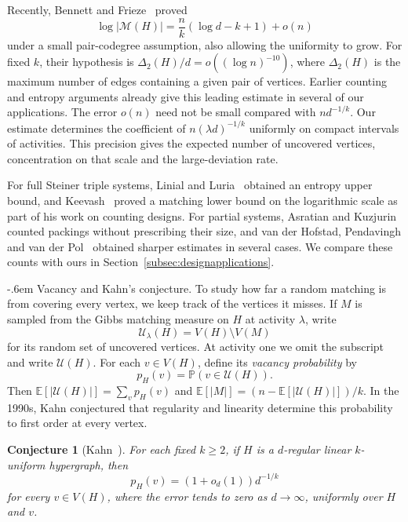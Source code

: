 \documentclass[11pt,reqno]{amsart}
\makeatletter
\numberwithin{equation}{section}
\renewcommand{\paragraph}{\@startsection{paragraph}{4}%
    \z@{.75\linespacing\@plus.2\linespacing\@minus.1\linespacing}%
    {-.6em}%
    {\normalfont\bfseries}}
\theoremstyle{plain}
\newtheorem{conjecture}[theorem]{Conjecture}
\theoremstyle{definition}
\newcommand{\calM}{\mathcal{M}}
\newcommand{\E}{\mathbb E}
\newcommand{\Prob}{\mathbb P}
\newcommand{\calU}{\mathcal U}
\makeatother
\begin{document}
Recently, Bennett and Frieze~\cite[Theorem~4(b)]{BF} proved
\[
    \log|\calM(H)|=\frac nk(\log d-k+1)+o(n)
\]
under a small pair-codegree assumption, also allowing the uniformity to grow.
For fixed $k$, their hypothesis is $\Delta_2(H)/d=o((\log n)^{-10})$, where $\Delta_2(H)$ is the maximum number of edges containing a given pair of vertices.
Earlier counting and entropy arguments already give this leading estimate in several of our applications.
The error $o(n)$ need not be small compared with $nd^{-1/k}$.
Our estimate determines the coefficient of $n(\lambda d)^{-1/k}$ uniformly on compact intervals of activities. This precision gives the expected number of uncovered vertices, concentration on that scale and the large-deviation rate.

For full Steiner triple systems, Linial and Luria~\cite{LinialLuria} obtained an entropy upper bound, and Keevash~\cite{KeevashCount} proved a matching lower bound on the logarithmic scale as part of his work on counting designs.
For partial systems, Asratian and Kuzjurin~\cite{AKPartial} counted packings without prescribing their size, and van der Hofstad, Pendavingh and van der Pol~\cite{HPP} obtained sharper estimates in several cases.
We compare these counts with ours in Section~\ref{subsec:designapplications}.


\paragraph{Vacancy and Kahn's conjecture.}
To study how far a random matching is from covering every vertex, we keep track of the vertices it misses.
If $M$ is sampled from the Gibbs matching measure on $H$ at activity $\lambda$, write
\[
    \calU_\lambda(H)=V(H)\setminus V(M)
\]
for its random set of uncovered vertices.
At activity one we omit the subscript and write $\calU(H)$.
For each $v\in V(H)$, define its \emph{vacancy probability} by
\[
    p_H(v)=\Prob(v\in\calU(H)).
\]
Then $\E[|\calU(H)|]=\sum_v p_H(v)$ and $\E[|M|]=(n-\E[|\calU(H)|])/k$.
In the 1990s, Kahn conjectured that regularity and linearity determine this probability to first order at every vertex.

\begin{conjecture}[Kahn~\cite{Kahn95,Kahn97}]\label{conj:Kahn}
    For each fixed $k\ge2$, if $H$ is a $d$-regular linear $k$-uniform hypergraph, then
    \[
        p_H(v)=(1+o_d(1))d^{-1/k}
    \]
    for every $v\in V(H)$, where the error tends to zero as $d\to\infty$, uniformly over $H$ and $v$.
\end{conjecture}
\end{document}
